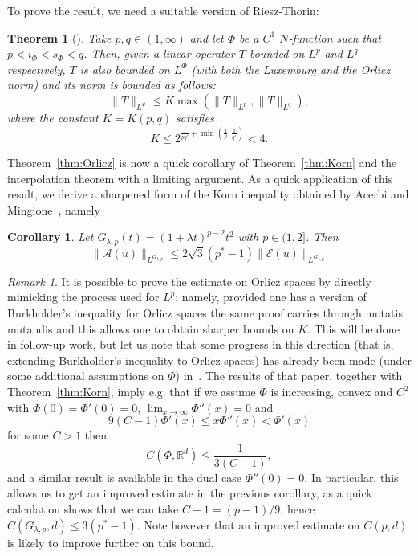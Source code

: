 \documentclass[11pt, a4paper]{amsart}
\newtheorem{theorem}{Theorem}[section]
\newtheorem{corollary}{Corollary}[theorem]
\theoremstyle{definition}
\theoremstyle{remark}
\newtheorem{remark}{Remark}
\newcommand{\R}{\mathbb{R}}
\begin{document}
To prove the result, we need a suitable 
version of Riesz-Thorin:
\begin{theorem}
    [{\cite[Theorem 5.1 and Remark 5.2]
    {RieszThorinOrlicz}}]
Take $p,q\in (1,\infty)$ and let
$\Phi$ be a $C^1$ $N$-function
such that $p<i_\Phi<s_\Phi<q$.
Then, given a linear operator $T$ bounded
on $L^p$ and $L^q$
respectively, $T$ is also bounded on $L^{\Phi}$
(with both the Luxemburg and the Orlicz norm) 
and its norm is bounded as follows:
\begin{equation*}
\|T\|_{L^\Phi}\le K\max(\|T\|_{L^p}, \|T\|_{L^q}),
\end{equation*}
where the constant $K=K(p,q)$ satisfies 
\begin{equation*}
K\le 2^{\frac{1}{pq'}+
\min\left(\frac1p,\frac1{q'}\right)}<4.
\end{equation*}
\end{theorem}
Theorem~\ref{thm:Orlicz} is now a quick corollary
of Theorem~\ref{thm:Korn}
and the interpolation
theorem with a limiting argument.
As a quick application of this result,
we derive a sharpened form of the Korn inequality
obtained by Acerbi and
Mingione~\cite{AcerbiMingione}, namely
\begin{corollary}
Let $G_{\lambda,p}(t)=(1+\lambda t)^{p-2}t^2$
with $p\in (1,2]$. Then
\begin{equation*}
\|\mathcal A(u)\|_{L^{G_{\lambda,p}}}
\le 2\sqrt 3(p^*-1)
\|\mathcal E(u)\|_{L^{G_{\lambda,p}}}
\end{equation*}
\end{corollary}
\begin{remark}
It is possible to prove the estimate on Orlicz spaces
by directly mimicking the process used for $L^p$:
namely, provided one has a version of
Burkholder's inequality for
Orlicz spaces the same proof
carries through mutatis mutandis
and this allows one to obtain sharper bounds on $K$.
This will be done in follow-up work,
but let us note that some progress
in this direction (that is, extending
Burkholder's inequality
to Orlicz spaces) has already been made (under some
additional assumptions on $\Phi$)
in~\cite{OsekowskiOrlicz}.
The results of that paper, together with
Theorem~\ref{thm:Korn}, imply
e.g. that if we assume $\Phi$ is increasing, convex
and $C^2$ with $\Phi(0)=\Phi'(0)=0$,
$\lim_{x\to \infty}\Phi''(x)=0$ and 
\begin{equation*}
9(C-1)\Phi'(x)\le x\Phi''(x)< \Phi'(x)
\end{equation*}
for some $C>1$ then 
\begin{equation*}
C(\Phi,\R^d)\le \frac1{3(C-1)},
\end{equation*}
and a similar result is available
in the dual case $\Phi''(0)=0$.
In particular, this allows us to get
an improved estimate
in the previous corollary, as a quick
calculation shows that we can take
$C-1=(p-1)/9$, hence $C(G_{\lambda,p}, d)\le 3(p^*-1)$.
Note however that an improved estimate on $C(p,d)$
is likely to improve
further on this bound.
\end{remark}
\end{document}

